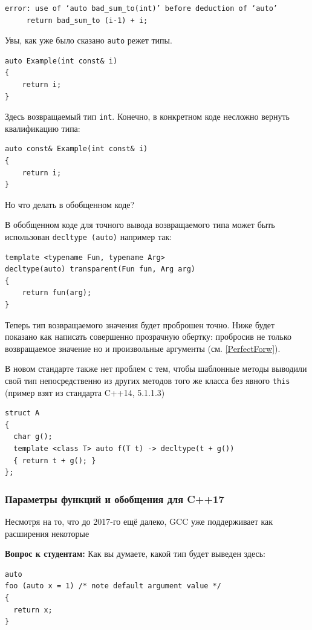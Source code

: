 \documentclass[a4paper,12pt,oneside]{article}
\begin{document}
\begin{verbatim}
error: use of ‘auto bad_sum_to(int)’ before deduction of ‘auto’
     return bad_sum_to (i-1) + i;
\end{verbatim}

Увы, как уже было сказано \lstinline!auto! режет типы. 

\begin{lstlisting}
auto Example(int const& i) 
{ 
    return i; 
}
\end{lstlisting}

Здесь возвращаемый тип \lstinline!int!. Конечно, в конкретном коде несложно вернуть квалификацию типа:

\begin{lstlisting}
auto const& Example(int const& i) 
{ 
    return i; 
}
\end{lstlisting}

Но что делать в обобщенном коде?

В обобщенном коде для точного вывода возвращаемого типа может быть использован \lstinline!decltype (auto)! например так:

\begin{lstlisting}
template <typename Fun, typename Arg>
decltype(auto) transparent(Fun fun, Arg arg) 
{ 
    return fun(arg); 
}
\end{lstlisting}

Теперь тип возвращаемого значения будет проброшен точно. Ниже будет показано как написать совершенно прозрачную обертку: пробросив не только возвращаемое значение но и произвольные аргументы (см. \ref{PerfectForw}).

В новом стандарте также нет проблем с тем, чтобы шаблонные методы выводили свой тип непосредственно из других методов того же класса без явного \lstinline!this! (пример взят из стандарта C++14, 5.1.1.3)

\begin{lstlisting}
struct A 
{
  char g();
  template <class T> auto f(T t) -> decltype(t + g())
  { return t + g(); }
};
\end{lstlisting}

\subsubsection{Параметры функций и обобщения для C++17}\label{DecltypeAuto17}

Несмотря на то, что до 2017-го ещё далеко, GCC уже поддерживает как расширения некоторые

\textbf{Вопрос к студентам:} Как вы думаете, какой тип будет выведен здесь: 
\begin{lstlisting}
auto 
foo (auto x = 1) /* note default argument value */
{
  return x;
}
\end{lstlisting}
\end{document}
